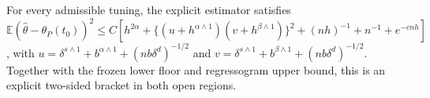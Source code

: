 For every admissible tuning, the explicit estimator satisfies \(\mathbb E(\widehat\theta-\theta_P(t_0))^2\le C[h^{2\alpha}+\{(u+h^{\alpha\wedge1})(v+h^{\beta\wedge1})\}^2+(nh)^{-1}+n^{-1}+e^{-cnh}]\), with \(u=\delta^{s\wedge1}+b^{\alpha\wedge1}+(nb\delta^d)^{-1/2}\) and \(v=\delta^{s\wedge1}+b^{\beta\wedge1}+(nb\delta^d)^{-1/2}\). Together with the frozen lower floor and regressogram upper bound, this is an explicit two-sided bracket in both open regions.
